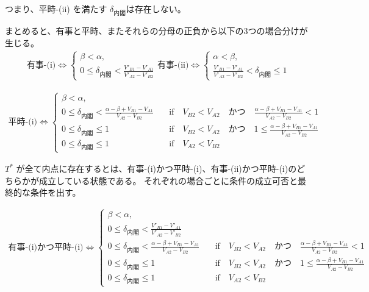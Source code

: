 \documentclass[main.tex]{subfiles}
\begin{document}
\noindent
つまり、平時-(ii) を満たす $\delta_{内閣}$は存在しない。

\bigskip
まとめると、有事と平時、またそれらの分母の正負から以下の3つの場合分けが生じる。
\begin{align*}
    \text{有事-(i)} \Leftrightarrow 
    \begin{cases}
        \beta < \alpha, \\
        0 \le \delta_{内閣} < \frac{V'_{B1}-V'_{A1}}{V'_{A2} - V'_{B2}}
    \end{cases}
    \text{有事-(ii)} \Leftrightarrow 
    \begin{cases}
        \alpha < \beta, \\
        \frac{V'_{B1}-V'_{A1}}{V'_{A2} - V'_{B2}} < \delta_{内閣} \le 1
    \end{cases}
\end{align*}

\begin{align*}
    \text{平時-(i)} \Leftrightarrow 
    \begin{cases}
        \beta < \alpha, \\
        0 \le \delta_{内閣} < \frac{\alpha-\beta + V_{B1}-V_{A1}}{V_{A2} - V_{B2}} \quad&\text{if}\quad V_{B2} < V_{A2} \quad{かつ}\quad \frac{\alpha-\beta + V_{B1}-V_{A1}}{V_{A2} - V_{B2}}<1\\
        0 \le \delta_{内閣} \le 1 \quad&\text{if}\quad V_{B2} < V_{A2} \quad{かつ}\quad 1 \le \frac{\alpha-\beta + V_{B1}-V_{A1}}{V_{A2} - V_{B2}}\\
        0 \le \delta_{内閣} \le 1 \quad&\text{if}\quad V_{A2} < V_{B2}
    \end{cases}
\end{align*}


\bigskip
$T^*$ が全て内点に存在するとは、有事-(i)かつ平時-(i)、有事-(ii)かつ平時-(i)のどちらかが成立している状態である。
それぞれの場合ごとに条件の成立可否と最終的な条件を出す。

\noindent
\begin{align*}
    \text{有事-(i)かつ平時-(i)} \Leftrightarrow 
    \begin{cases}
        \beta < \alpha, \\
        0 \le \delta_{内閣} < \frac{V'_{B1}-V'_{A1}}{V'_{A2} - V'_{B2}}\\
        0 \le \delta_{内閣} < \frac{\alpha-\beta + V_{B1}-V_{A1}}{V_{A2} - V_{B2}} \quad&\text{if}\quad V_{B2} < V_{A2} \quad{かつ}\quad \frac{\alpha-\beta + V_{B1}-V_{A1}}{V_{A2} - V_{B2}}<1\\
        0 \le \delta_{内閣} \le 1 \quad&\text{if}\quad V_{B2} < V_{A2} \quad{かつ}\quad 1 \le \frac{\alpha-\beta + V_{B1}-V_{A1}}{V_{A2} - V_{B2}}\\
        0 \le \delta_{内閣} \le 1 \quad&\text{if}\quad V_{A2} < V_{B2}
    \end{cases}
\end{align*}
\end{document}
